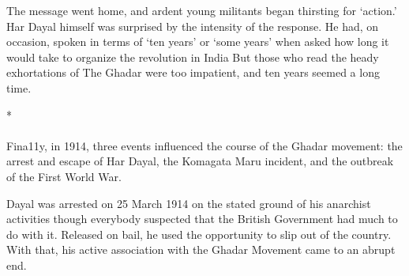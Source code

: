
The message went home, and ardent young militants began thirsting for `action.' Har Dayal himself was surprised by the intensity of the response. He had, on occasion, spoken in terms of `ten years' or `some years' when asked how long it would take to organize the revolution in India But those who read the heady exhortations of The Ghadar were too impatient, and ten years seemed a long time.

\begin{center}*\end{center}

\paragraph*{}

Fina11y, in 1914, three events influenced the course of the Ghadar movement: the arrest and escape of Har Dayal, the Komagata Maru incident, and the outbreak of the First World War.

Dayal was arrested on 25 March 1914 on the stated ground of his anarchist activities though everybody suspected that the British Government had much to do with it. Released on bail, he used the opportunity to slip out of the country. With that, his active association with the Ghadar Movement came to an abrupt end.

